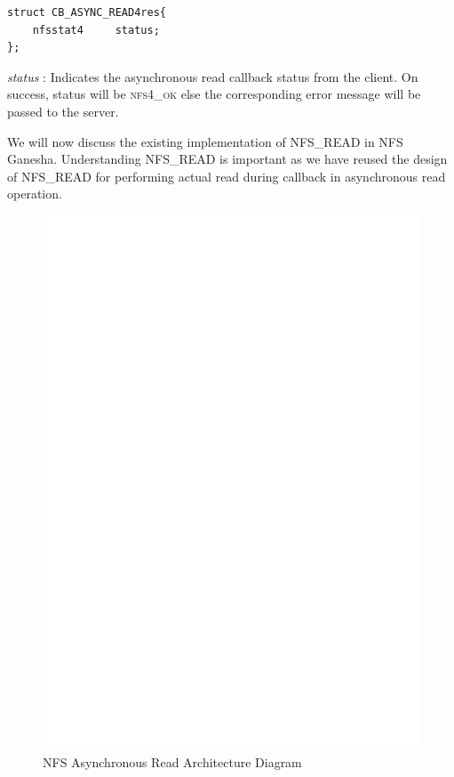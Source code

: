\begin{lstlisting}
struct CB_ASYNC_READ4res{
	nfsstat4	 status;
};
\end{lstlisting}

\noindent\textit{status} : Indicates the asynchronous read callback status from the client. On success, status will be \textsc{nfs4\_ok} else the corresponding error message will be passed to the server.



We will now discuss the existing implementation of \textsc{NFS\_READ} in NFS Ganesha. Understanding \textsc{NFS\_READ} is important as we have reused the design of \textsc{NFS\_READ} for performing actual read during callback in asynchronous read operation.

\begin{figure}
\centering
\includegraphics[scale=0.7]{figures/AsyncRead.eps}
\caption{NFS Asynchronous Read Architecture Diagram}
\label{fig:NFSAsyncReadArch}
\end{figure}
\FloatBarrier

